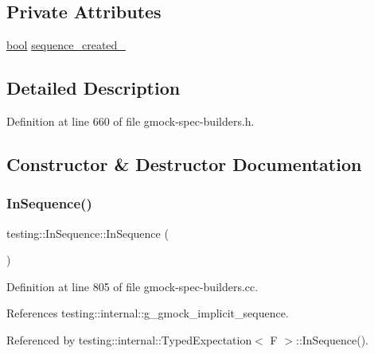 \subsection*{Private Attributes}
\begin{DoxyCompactItemize}
\item 
\hyperlink{classbool}{bool} \hyperlink{classtesting_1_1InSequence_ae8a5805923f65001454a83f344f9292c}{sequence\+\_\+created\+\_\+}
\end{DoxyCompactItemize}


\subsection{Detailed Description}


Definition at line 660 of file gmock-\/spec-\/builders.\+h.



\subsection{Constructor \& Destructor Documentation}
\mbox{\label{classtesting_1_1InSequence_ac40a4ac3e4f26e088ebc09e543514b6b}} 
\subsubsection{\texorpdfstring{In\+Sequence()}{InSequence()}}
{\footnotesize\ttfamily testing\+::\+In\+Sequence\+::\+In\+Sequence (\begin{DoxyParamCaption}{ }\end{DoxyParamCaption})}



Definition at line 805 of file gmock-\/spec-\/builders.\+cc.



References testing\+::internal\+::g\+\_\+gmock\+\_\+implicit\+\_\+sequence.



Referenced by testing\+::internal\+::\+Typed\+Expectation$<$ F $>$\+::\+In\+Sequence().


